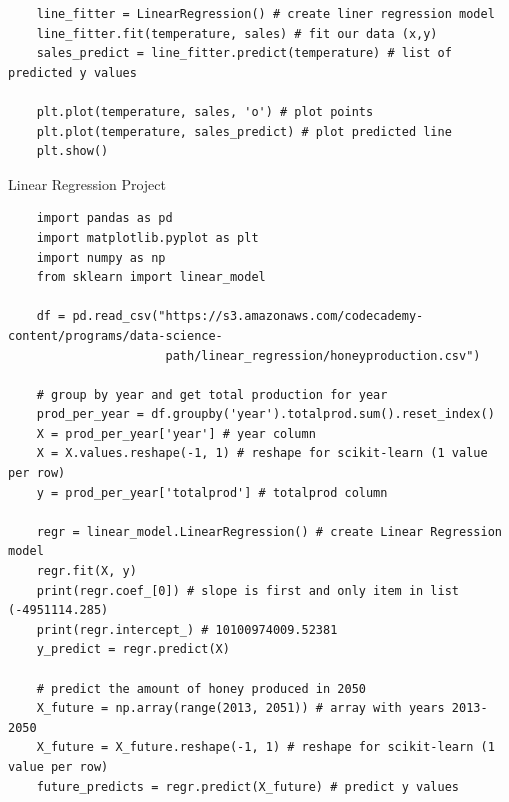 \documentclass[11pt, a4paper]{article}
\begin{document}
\begin{spacing}{1.1}
\begin{lstlisting}
	line_fitter = LinearRegression() # create liner regression model
	line_fitter.fit(temperature, sales) # fit our data (x,y)
	sales_predict = line_fitter.predict(temperature) # list of predicted y values
	
	plt.plot(temperature, sales, 'o') # plot points
	plt.plot(temperature, sales_predict) # plot predicted line
	plt.show() \end{lstlisting}\vspace*{1mm}
	Linear Regression Project 
	\begin{lstlisting}
	import pandas as pd
	import matplotlib.pyplot as plt
	import numpy as np
	from sklearn import linear_model
	
	df = pd.read_csv("https://s3.amazonaws.com/codecademy-content/programs/data-science-
	                  path/linear_regression/honeyproduction.csv")
	
	# group by year and get total production for year
	prod_per_year = df.groupby('year').totalprod.sum().reset_index()
	X = prod_per_year['year'] # year column
	X = X.values.reshape(-1, 1) # reshape for scikit-learn (1 value per row)
	y = prod_per_year['totalprod'] # totalprod column
	
	regr = linear_model.LinearRegression() # create Linear Regression model
	regr.fit(X, y)
	print(regr.coef_[0]) # slope is first and only item in list (-4951114.285)
	print(regr.intercept_) # 10100974009.52381
	y_predict = regr.predict(X)
	
	# predict the amount of honey produced in 2050
	X_future = np.array(range(2013, 2051)) # array with years 2013-2050
	X_future = X_future.reshape(-1, 1) # reshape for scikit-learn (1 value per row)
	future_predicts = regr.predict(X_future) # predict y values \end{lstlisting} \newpage
	

\end{spacing}
\end{document}
